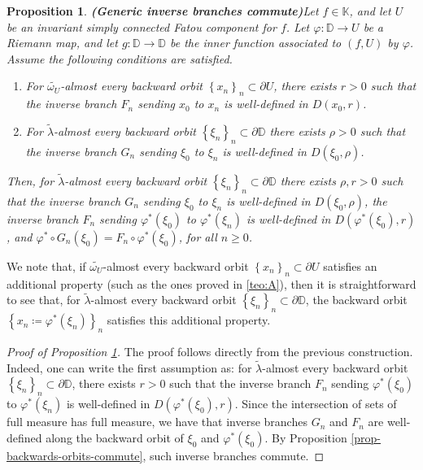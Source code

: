 \documentclass[11pt]{article}
\newtheorem{prop}[thm]{Proposition}
\theoremstyle{definition}
\theoremstyle{remark}
\theoremstyle{plain}
\begin{document}
\begin{prop}{\bf (Generic inverse branches commute)}\label{prop-generic-inverse-branches}
	Let $ f\in \mathbb{K}$, and let $U$ be an invariant simply connected Fatou component for $ f $. Let $ \varphi\colon\mathbb{D}\to U $ be a Riemann map, and let $ g\colon\mathbb{D}\to\mathbb{D} $ be the  inner function  associated to $ (f, U) $ by $ \varphi $. Assume the following conditions are satisfied.
	\begin{enumerate}[label={\em (\alph*)}]
		\item For $ \widetilde{\omega_U }$-almost every  backward orbit $ \left\lbrace x_n\right\rbrace _n \subset\partial U$, there exists $ r>0 $ such that the inverse branch $ F_n $ sending $x_0 $ to $ x_n $ is well-defined in $ D(x_0,r) $.
		\item For $ \widetilde{\lambda} $-almost every backward orbit $ \left\lbrace \xi_n\right\rbrace _n\subset\partial\mathbb{D} $  there exists $ \rho>0 $ such that the inverse branch $ G_n $ sending $\xi_0 $ to $ \xi_n $ is well-defined in $ D(\xi_0,\rho) $.
	\end{enumerate}
	Then, for $ \widetilde{\lambda} $-almost every backward orbit $ \left\lbrace \xi_n\right\rbrace _n\subset\partial\mathbb{D} $  there exists $ \rho, r>0 $ such that the inverse branch $ G_n $ sending $\xi_0 $ to $ \xi_n $ is well-defined in $ D(\xi_0,\rho) $, the inverse branch $ F_n $ sending $\varphi^*(\xi_0) $ to $ \varphi^*(\xi_n)  $ is well-defined in $ D(\varphi^*(\xi_0) ,r) $, and $ \varphi^*\circ G_n (\xi_0)=F_n\circ \varphi^*(\xi_0) $, for all $ n\geq 0 $.
\end{prop}

We note that, if $ \widetilde{\omega_U }$-almost every  backward orbit $ \left\lbrace x_n\right\rbrace _n \subset\partial U$ satisfies an additional property (such as the ones proved in \ref{teo:A}), then it is straightforward to see that, for $ \widetilde{\lambda} $-almost every backward orbit $ \left\lbrace \xi_n\right\rbrace _n\subset\partial\mathbb{D} $, the backward orbit $ \left\lbrace x_n\coloneqq \varphi^*(\xi_n)\right\rbrace _n $ satisfies this additional property.

\begin{proof}[Proof of Proposition \ref{prop-generic-inverse-branches}]
	The proof follows directly from the previous construction. Indeed, one can write the first assumption as: for $ \widetilde{\lambda} $-almost every backward orbit $ \left\lbrace \xi_n\right\rbrace _n\subset\partial\mathbb{D} $, there exists $ r>0 $ such that the inverse branch $ F_n $ sending $\varphi^*(\xi_0) $ to $ \varphi^*(\xi_n )$ is well-defined in $ D(\varphi^*(\xi_0),r) $. Since the intersection of sets of full measure has full measure, we have that inverse branches $ G_n $ and $ F_n $ are well-defined along the backward orbit of $ \xi_0 $ and $ \varphi^*(\xi_0) $.
	By Proposition \ref{prop-backwards-orbits-commute}, such inverse branches commute.
\end{proof}
\end{document}
